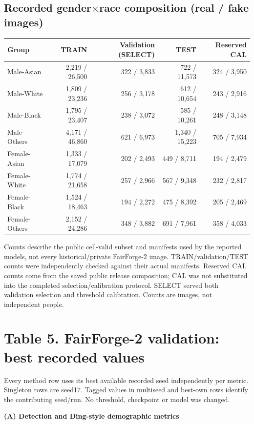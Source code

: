 \documentclass[10pt]{article}
\newcommand{\note}[1]{{\fontsize{8}{10}\selectfont #1\par}}
\begin{document}
\subsection*{Recorded gender$\times$race composition (real / fake images)}
{\fontsize{10}{11.5}\selectfont\setlength{\tabcolsep}{3pt}
\renewcommand{\arraystretch}{1.05}
\begin{tabular*}{\linewidth}{@{\extracolsep{\fill}}lrrrr}\toprule
Group & TRAIN & Validation (SELECT) & TEST & Reserved CAL\\\midrule
Male-Asian & 2,219 / 26,500 & 322 / 3,833 & 722 / 11,573 & 324 / 3,950\\
Male-White & 1,809 / 23,236 & 256 / 3,178 & 612 / 10,654 & 243 / 2,916\\
Male-Black & 1,795 / 23,407 & 238 / 3,072 & 585 / 10,261 & 248 / 3,148\\
Male-Others & 4,171 / 46,860 & 621 / 6,973 & 1,340 / 15,223 & 705 / 7,934\\
Female-Asian & 1,333 / 17,079 & 202 / 2,493 & 449 / 8,711 & 194 / 2,479\\
Female-White & 1,774 / 21,658 & 257 / 2,966 & 567 / 9,348 & 232 / 2,817\\
Female-Black & 1,524 / 18,463 & 194 / 2,272 & 475 / 8,392 & 205 / 2,469\\
Female-Others & 2,152 / 24,286 & 348 / 3,882 & 691 / 7,961 & 358 / 4,033\\
\bottomrule\end{tabular*}}\par
\note{Counts describe the public cell-valid subset and manifests used by the reported models, not every historical/private FairForge-2 image. TRAIN/validation/TEST counts were independently checked against their actual manifests. Reserved CAL counts come from the saved public release composition; CAL was not substituted into the completed selection/calibration protocol. SELECT served both validation selection and threshold calibration. Counts are images, not independent people.}
\clearpage\section*{Table 5. FairForge-2 validation: best recorded values}
\note{Every method row uses its best available recorded seed independently per metric. Singleton rows are seed17. Tagged values in multiseed and best-own rows identify the contributing seed/run. No threshold, checkpoint or model was changed.}
\textbf{(A) Detection and Ding-style demographic metrics}\par
\end{document}
